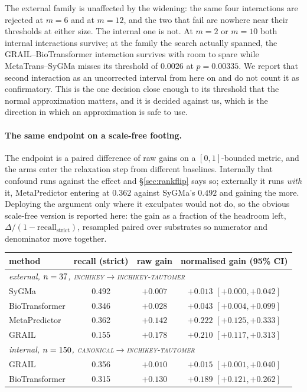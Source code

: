 The external family is unaffected by the widening: the same four interactions are rejected at
$m=6$ and at $m=12$, and the two that fail are nowhere near their thresholds at either size. The
internal one is not. At $m=2$ or $m=10$ both internal interactions survive; at the family the
search actually spanned, the GRAIL--BioTransformer interaction survives with room to spare while
MetaTrans--SyGMa misses its threshold of $0.0026$ at $p=0.00335$. We report that second interaction
as an uncorrected interval from here on and do not count it as confirmatory. This is the one decision
close enough to its threshold that the normal approximation matters, and it is decided against us,
which is the direction in which an approximation is safe to use.

\paragraph{The same endpoint on a scale-free footing.} The endpoint is a paired difference of raw
gains on a $[0,1]$-bounded metric, and the arms enter the relaxation step from different baselines.
Internally that confound runs against the effect and \S\ref{sec:rankflip} says so; externally it
runs \emph{with} it, MetaPredictor entering at $0.362$ against SyGMa's $0.492$ and gaining the more.
Deploying the argument only where it exculpates would not do, so the obvious scale-free version is
reported here: the gain as a fraction of the headroom left, $\Delta/(1-\text{recall}_{\text{strict}})$,
resampled paired over substrates so numerator and denominator move together.

\begin{center}
\begin{tabular}{lccc}
\toprule
method & recall (strict) & raw gain & normalised gain (95\% CI) \\
\midrule
\multicolumn{4}{l}{\emph{external, $n=37$, \textsc{inchikey}$\rightarrow$\textsc{inchikey-tautomer}}} \\
SyGMa          & 0.492 & $+0.007$ & $+0.013$ $[+0.000,+0.042]$ \\
BioTransformer & 0.346 & $+0.028$ & $+0.043$ $[+0.004,+0.099]$ \\
MetaPredictor  & 0.362 & $+0.142$ & $+0.222$ $[+0.125,+0.333]$ \\
GRAIL          & 0.155 & $+0.178$ & $+0.210$ $[+0.117,+0.313]$ \\
\midrule
\multicolumn{4}{l}{\emph{internal, $n=150$, \textsc{canonical}$\rightarrow$\textsc{inchikey-tautomer}}} \\
GRAIL          & 0.356 & $+0.010$ & $+0.015$ $[+0.001,+0.040]$ \\
BioTransformer & 0.315 & $+0.130$ & $+0.189$ $[+0.121,+0.262]$ \\
\bottomrule
\end{tabular}
\end{center}

